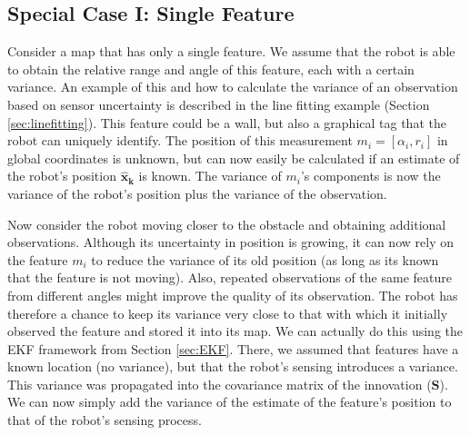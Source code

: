 \documentclass[paper=6.14in:9.21in,pagesize=pdftex,11pt,twoside,openright]{scrbook}
\begin{document}
\subsection{Special Case I: Single Feature}
Consider a map that has only a single feature. We assume that the robot is able to obtain the relative range and angle of this feature, each with a certain variance. An example of this and how to calculate the variance of an observation based on sensor uncertainty is described in the line fitting example (Section \ref{sec:linefitting}). This feature could be a wall, but also a graphical tag that the robot can uniquely identify. The position of this measurement $m_i=[\alpha_i,r_i]$  in global coordinates is unknown, but can now easily be calculated if an estimate of the robot's position $\boldsymbol{\hat{x}_k}$ is known.  The variance of $ m_i$'s components is now the variance of the robot's position plus the variance of the observation.

Now consider the robot moving closer to the obstacle and obtaining additional observations. Although its uncertainty in position is growing, it can now rely on the feature $m_i$ to reduce the variance of its old position (as long as its known that the feature is not moving). Also, repeated observations of the same feature from different angles might improve the quality of its observation. The robot has therefore a chance to keep its variance very close to that with which it initially observed the feature and stored it into its map. We can actually do this using the EKF framework from Section \ref{sec:EKF}. There, we assumed that features have a known location (no variance), but that the robot's sensing introduces a variance. This variance was propagated into the covariance matrix of the innovation ($ \boldsymbol{S}$). We can now simply add the variance of the estimate of the feature's position to that of the robot's sensing process.
\end{document}
